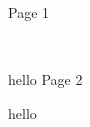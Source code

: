 \documentclass{article}
\begin{document}
    \begin{minipage}[t][0.5\textheight][t]{\textwidth}
        Page 1
    \end{minipage} \\
    \begin{minipage}[b][0.49\textheight][t]{\textwidth}
        hello
        Page 2
    \end{minipage}
    hello
\end{document}
